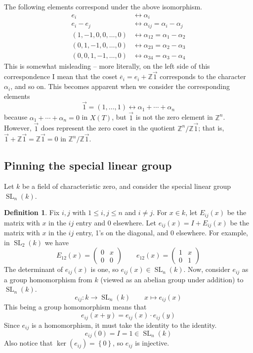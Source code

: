 \documentclass[12pt]{article}
\theoremstyle{definition}
\newtheorem{definition}[theorem]{Definition}
\newcommand{\Z}{\mathbb{Z}}
\newcommand{\lp}{\left(}
\newcommand{\rp}{\right)}
\newcommand{\lb}{\left\{}
\newcommand{\rb}{\right\}}
\newcommand{\noi}{\noindent}
\newcommand{\ov}{\overline}
\DeclareMathOperator{\SL}{SL}
\begin{document}
\noi The following elements correspond under the above isomorphism.
\begin{align*}
	e_i &\longleftrightarrow \alpha_i \\
	e_i - e_j &\longleftrightarrow \alpha_{ij} = \alpha_i - \alpha_j \\
	(1, -1, 0, 0, \ldots, 0) &\longleftrightarrow \alpha_{12} = \alpha_1 - \alpha_2 \\
	(0, 1, -1, 0, \ldots, 0) &\longleftrightarrow \alpha_{23} = \alpha_2 - \alpha_3 \\
	(0, 0, 1, -1, \ldots, 0) &\longleftrightarrow \alpha_{34} = \alpha_3 - \alpha_4
\end{align*}
This is somewhat misleading -- more literally, on the left side of this correspondence I mean that the coset $\ov e_i = e_i + \Z \vec 1$ corresponds to the character $\alpha_i$, and so on. This becomes apparent when we consider the corresponding elements
\[
	\vec 1 = (1, \ldots, 1) \longleftrightarrow \alpha_1 + \cdots + \alpha_n
\]
because $\alpha_1 + \cdots + \alpha_n = 0$ in $X(T)$, but $\vec 1$ is not the zero element in $\Z^n$. However, $\vec 1$ does represent the zero coset in the quotient $\Z^n / \Z \vec 1$; that is, $\vec 1 + \Z \vec 1 = \Z \vec 1 = 0$ in $\Z^n / \Z \vec 1$.

\subsection{Pinning the special linear group}

Let $k$ be a field of characteristic zero, and consider the special linear group $\SL_n(k)$.

\begin{definition}
Fix $i, j$ with $1 \le i, j \le n$ and $i \neq j$. For $x \in k$, let $E_{ij}(x)$ be the matrix with $x$ in the $ij$ entry and 0 elsewhere. Let $e_{ij}(x) = I + E_{ij}(x)$ be the matrix with $x$ in the $ij$ entry, 1's on the diagonal, and 0 elsewhere. For example, in $\SL_2(k)$ we have
\[
	E_{12}(x) =
	\begin{pmatrix}
		0 & x \\
		0 & 0
	\end{pmatrix}
	\qquad
	e_{12}(x) =
	\begin{pmatrix}
		1 & x \\
		0 & 1
	\end{pmatrix}
\]
The determinant of $e_{ij}(x)$ is one, so $e_{ij}(x) \in \SL_n(k)$. Now, consider $e_{ij}$ as a group homomorphism from $k$ (viewed as an abelian group under addition) to $\SL_n(k)$.
\[
	e_{ij}:k \to \SL_n(k) \qquad x \mapsto e_{ij}(x)
\]
This being a group homomorphism means that
\[
	e_{ij}(x+y) = e_{ij}(x) \cdot e_{ij}(y)
\]
Since $e_{ij}$ is a homomorphism, it must take the identity to the identity.
\[
	e_{ij}(0) = I =1 \in \SL_n(k)
\]
Also notice that $\ker \lp e_{ij} \rp = \lb 0 \rb$, so $e_{ij}$ is injective. 
\end{definition}
\end{document}
